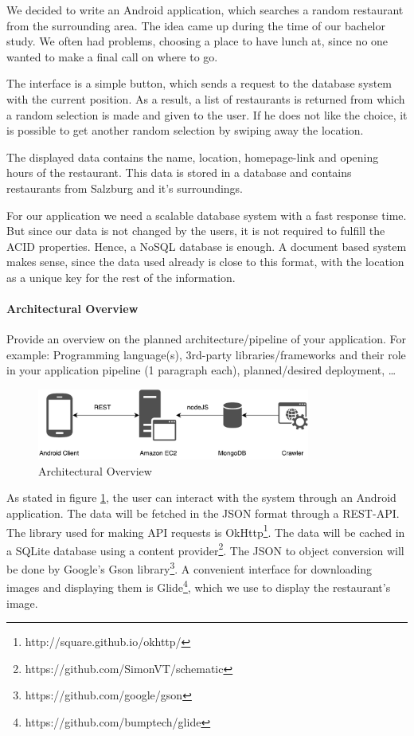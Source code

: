 We decided to write an Android application, which searches a random restaurant from the surrounding area. The idea came up during the time of our bachelor study. We often had problems, choosing a place to have lunch at, since no one wanted to make a final call on where to go.

The interface is a simple button, which sends a request to the database system with the current position. As a result, a list of restaurants is returned from which a random selection is made and given to the user. If he does not like the choice, it is possible to get another random selection by swiping away the location.

The displayed data contains the name, location, homepage-link and opening hours of the restaurant. This data is stored in a database and contains restaurants from Salzburg and it's surroundings. 

For our application we need a scalable database system with a fast response time. But since our data is not changed by the users, it is not required to fulfill the ACID properties. Hence, a NoSQL database is enough. A document based system makes sense, since the data used already is close to this format, with the location as a unique key for the rest of the information.



\paragraph{Architectural Overview}

Provide an overview on the planned architecture/pipeline of your application.
For example: Programming language(s), 3rd-party libraries/frameworks and their
role in your application pipeline (1 paragraph each), planned/desired
deployment, \ldots

\begin{figure}[H]
	\centering
	\includegraphics[width=0.8\textwidth]{img/Arch}
	\caption{Architectural Overview}
	\label{fig:Arch}
\end{figure}

As stated in figure \ref{fig:Arch}, the user can interact with the system through an Android application. The data will be fetched in the JSON format through a REST-API. The library used for making API requests is OkHttp\footnote{http://square.github.io/okhttp/}. The data will be cached in a SQLite database using a content provider\footnote{https://github.com/SimonVT/schematic}. The JSON to object conversion will be done by Google's Gson library\footnote{https://github.com/google/gson}. A convenient interface for downloading images and displaying them is Glide\footnote{https://github.com/bumptech/glide}, which we use to display the restaurant's image. 

